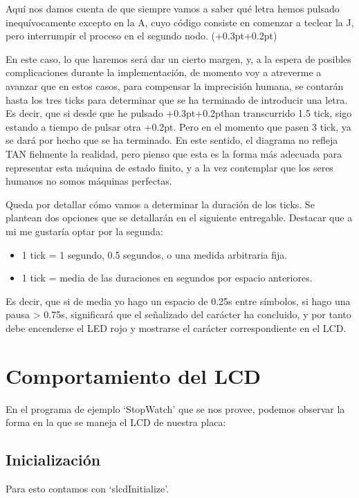 \documentclass[a4paper,openright,12pt]{article}
\newcommand{\punto}{\kern+0.3pt\raisebox{0.35ex}{\huge\textbf.}}
\newcommand{\raya}{\kern+0.2pt\raisebox{-0.35ex}{\huge\textbf-}}
\begin{document}
Aquí nos damos cuenta de que siempre vamos a saber qué letra hemos pulsado inequívocamente excepto en la A, cuyo código consiste en comenzar a teclear la J, pero interrumpir
el proceso en el segundo nodo. (\punto\raya)

En este caso, lo que haremos será dar un cierto margen, y, a la espera de posibles complicaciones durante la implementación, de momento voy a atreverme a avanzar que en
estos casos, para compensar la imprecisión humana, se contarán hasta los tres ticks para determinar que se ha terminado de introducir una letra.
Es decir, que si desde que he pulsado \punto\raya \space han transcurrido 1.5 tick, sigo estando a tiempo de pulsar otra \raya. Pero en el momento que pasen 3 tick,
ya se dará por hecho que se ha terminado. En este sentido, el diagrama no refleja TAN fielmente la realidad, pero pienso que esta es la forma más adecuada para representar
esta máquina de estado finito, y a la vez contemplar que los seres humanos no somos máquinas perfectas.

Queda por detallar cómo vamos a determinar la duración de los ticks. Se plantean dos opciones que se detallarán en el siguiente entregable.
Destacar que a mi me gustaría optar por la segunda:

\begin{itemize}
    \item 1 tick = 1 segundo, 0.5 segundos, o una medida arbitraria fija.
    \item 1 tick = media de las duraciones en segundos por espacio anteriores.
\end{itemize}

Es decir, que si de media yo hago un espacio de 0.25s entre símbolos, si hago una pausa > 0.75s, significará que el señalizado del carácter ha concluido, y por tanto debe
encenderse el LED rojo y mostrarse el carácter correspondiente en el LCD.




\section{Comportamiento del LCD}
En el programa de ejemplo `StopWatch' que se nos provee, podemos observar la forma en la que se maneja el LCD de nuestra placa:

\subsection{Inicialización}
Para esto contamos con `slcdInitialize'.
\end{document}
